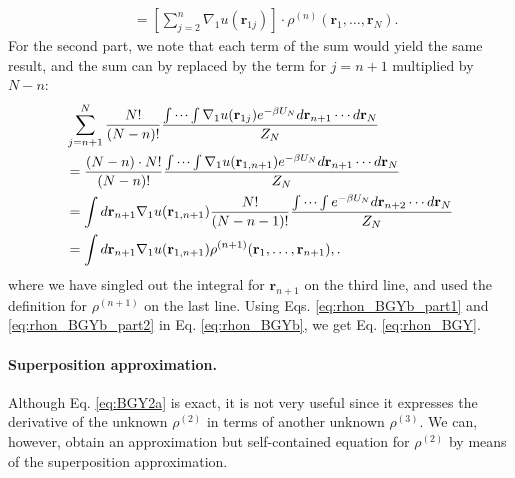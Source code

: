 \documentclass[twocolumn, 10pt]{article}
\numberwithin{equation}{section}
\newenvironment{solution}[1][\empty]
{\par\medskip\sffamily
  \textbf{\ifx\empty#1{Solution.}\relax\else{#1}\fi} \ignorespaces}
{\medskip}
\begin{document}
\begin{solution}
\begin{align}
  &=
  \left[
    \sum_{j=2}^n
    \nabla_1 u(\mathbf r_{1j})
  \right]
  \cdot
  \rho^{(n)}(\mathbf r_1, \dots, \mathbf r_N)
  .
  \label{eq:rhon_BGYb_part1}
\end{align}
%
For the second part,
we note that each term of the sum
would yield the same result,
and the sum can by replaced by the term for $j = n+1$
multiplied by $N-n$:
\begin{align}
  &\sum_{j=n+1}^N
  \frac{ N! } { (N-n)! }
  \frac{
    \idotsint
    \nabla_1 u(\mathbf r_{1j})
    e^{-\beta U_N} d\mathbf r_{n+1} \cdots d\mathbf r_N
  } { Z_N }
  \notag \\
  &=
  \frac{ (N-n) \cdot N! } { (N-n)! }
  \frac{
    \idotsint
    \nabla_1 u(\mathbf r_{1,n+1})
    e^{-\beta U_N} d\mathbf r_{n+1} \cdots d\mathbf r_N
  } { Z_N }
  \notag \\
  &=
  \int d\mathbf r_{n+1}
  \nabla_1 u(\mathbf r_{1,n+1})
  \frac{ N! } { (N-n-1)! }
  \frac{
    \idotsint
    e^{-\beta U_N} d\mathbf r_{n+2}\cdots d\mathbf r_N
  } { Z_N }
  \notag \\
  &=
  \int d\mathbf r_{n+1}
  \nabla_1 u(\mathbf r_{1,n+1})
  \rho^{(n+1)}(\mathbf r_1, \dots, \mathbf r_{n+1})
  ,
  .
  \label{eq:rhon_BGYb_part2}
\end{align}
where we have singled out the integral for $\mathbf r_{n+1}$
on the third line,
and used the definition for $\rho^{(n+1)}$
on the last line.
%
Using Eqs. \eqref{eq:rhon_BGYb_part1}
and \eqref{eq:rhon_BGYb_part2} in Eq. \eqref{eq:rhon_BGYb},
we get Eq. \eqref{eq:rhon_BGY}.


\paragraph*{Superposition approximation.}

Although Eq. \eqref{eq:BGY2a} is exact,
it is not very useful
since it expresses the derivative of the unknown $\rho^{(2)}$
in terms of another unknown $\rho^{(3)}$.
%
We can, however, obtain an approximation but self-contained equation
for $\rho^{(2)}$ by means of the superposition approximation.


\end{solution}
\end{document}

